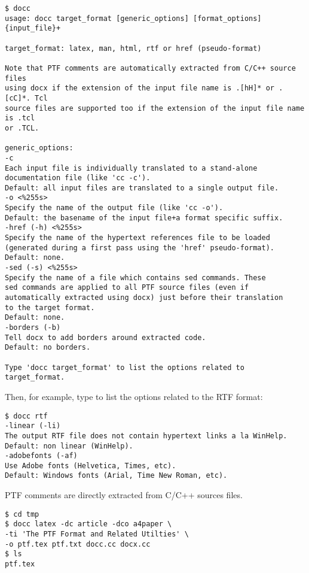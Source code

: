 \begin{pverbatim}
\begin{verbatim}
$ docc
usage: docc target_format [generic_options] [format_options] {input_file}+

target_format: latex, man, html, rtf or href (pseudo-format)

Note that PTF comments are automatically extracted from C/C++ source files
using docx if the extension of the input file name is .[hH]* or .[cC]*. Tcl
source files are supported too if the extension of the input file name is .tcl
or .TCL.

generic_options:
-c 
Each input file is individually translated to a stand-alone
documentation file (like 'cc -c').
Default: all input files are translated to a single output file.
-o <%255s>
Specify the name of the output file (like 'cc -o').
Default: the basename of the input file+a format specific suffix.
-href (-h) <%255s>
Specify the name of the hypertext references file to be loaded
(generated during a first pass using the 'href' pseudo-format).
Default: none.
-sed (-s) <%255s>
Specify the name of a file which contains sed commands. These
sed commands are applied to all PTF source files (even if
automatically extracted using docx) just before their translation
to the target format.
Default: none.
-borders (-b) 
Tell docx to add borders around extracted code.
Default: no borders.

Type 'docc target_format' to list the options related to
target_format.
\end{verbatim}
\end{pverbatim}

Then, for example, type  to list the options related to
the RTF format:

\begin{pverbatim}
\begin{verbatim}
$ docc rtf
-linear (-li) 
The output RTF file does not contain hypertext links a la WinHelp.
Default: non linear (WinHelp).
-adobefonts (-af) 
Use Adobe fonts (Helvetica, Times, etc).
Default: Windows fonts (Arial, Time New Roman, etc).
\end{verbatim}
\end{pverbatim}



PTF comments are directly extracted from C/C++ sources files.

\begin{pverbatim}
\begin{verbatim}
$ cd tmp
$ docc latex -dc article -dco a4paper \
-ti 'The PTF Format and Related Utilties' \
-o ptf.tex ptf.txt docc.cc docx.cc
$ ls
ptf.tex
\end{verbatim}
\end{pverbatim}

